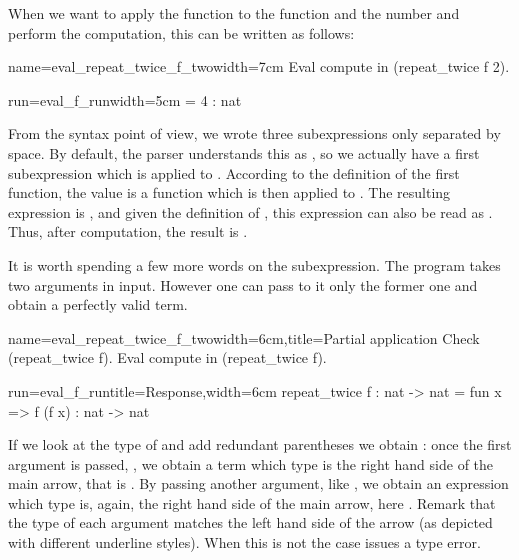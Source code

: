 When we want to apply the function  to the function
 and the number  and perform the computation, this can be
written as follows:

\begin{coq}{name=eval_repeat_twice_f_two}{width=7cm}
Eval compute in (repeat_twice f 2).
\end{coq}
\begin{coqout}{run=eval_f_run}{width=5cm}
= 4 : nat
\end{coqout}
From the syntax point of view, we wrote three subexpressions only
separated by space.  By default, the parser understands this as
, so we actually have a first subexpression
which is  applied to .  According to the
definition of the first function, the value is 
a function 
which is then applied to . 
The resulting expression is , and given the
definition of , this expression can also
be read as .  Thus, after computation, the result is .

It is worth spending a few more words on the  subexpression.
The  program takes two arguments in input. However one
can pass to it only the former one and obtain a perfectly valid term.

\begin{coq}{name=eval_repeat_twice_f_two}{width=6cm,title=Partial application}
Check (repeat_twice f).
Eval compute in (repeat_twice f).
\end{coq}
\begin{coqout}{run=eval_f_run}{title=Response,width=6cm}
repeat_twice f : nat -> nat
= fun x => f (f x) : nat -> nat
\end{coqout}
If we look at the type of  and add redundant parentheses
we obtain :
once the first argument
is passed, , we obtain a term which type is
the right hand side of the main arrow, that is .
By passing another argument, like , we obtain an expression
which type is, again, the right hand side of the main arrow, here .
Remark that the type of each argument matches the left hand side of
the arrow (as depicted with different underline styles).
When this is not the case \Coq{} issues a type error.

